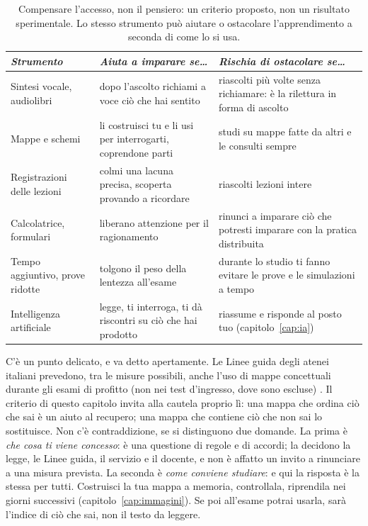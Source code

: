 \begin{table}[tbp]
  \centering\small
  \begin{tabular}{@{}>{\raggedright\arraybackslash}p{}>{\raggedright\arraybackslash}p{}>{\raggedright\arraybackslash}p{}@{}}
    \toprule
    \textit{Strumento} & \textit{Aiuta a imparare se\dots} & \textit{Rischia di ostacolare se\dots} \\
    \midrule
    Sintesi vocale, audiolibri & dopo l'ascolto richiami a voce ciò
      che hai sentito & riascolti più volte senza richiamare: è la
      rilettura in forma di ascolto \\
    \addlinespace
    Mappe e schemi & li costruisci tu e li usi per interrogarti,
      coprendone parti & studi su mappe fatte da altri e le consulti
      sempre \\
    \addlinespace
    Registrazioni delle lezioni & colmi una lacuna precisa, scoperta
      provando a ricordare & riascolti lezioni intere \\
    \addlinespace
    Calcolatrice, formulari & liberano attenzione per il
      ragionamento & rinunci a imparare ciò che potresti imparare con
      la pratica distribuita \\
    \addlinespace
    Tempo aggiuntivo, prove ridotte & tolgono il peso della lentezza
      all'esame & durante lo studio ti fanno evitare le prove e le simulazioni a tempo \\
    \addlinespace
    Intelligenza artificiale & legge, ti interroga, ti dà riscontri
      su ciò che hai prodotto & riassume e risponde al posto tuo
      (capitolo~\ref{cap:ia}) \\
    \bottomrule
  \end{tabular}
  \caption{Compensare l'accesso, non il pensiero: un criterio
    proposto, non un risultato sperimentale. Lo stesso strumento può
    aiutare o ostacolare l'apprendimento a seconda di come lo si usa.}
  \label{tab:compensare}
\end{table}

C'è un punto delicato, e va detto apertamente. Le Linee guida degli
atenei italiani prevedono, tra le misure possibili, anche l'uso di
mappe concettuali durante gli esami di profitto (non nei test
d'ingresso, dove sono escluse) \parencite{cnudd2024}. Il criterio
di questo capitolo invita alla cautela proprio lì: una mappa che
ordina ciò che sai è un aiuto al recupero; una mappa che contiene ciò
che non sai lo sostituisce. Non c'è contraddizione, se si distinguono
due domande. La prima è \emph{che cosa ti viene concesso}: è una questione di regole e di accordi; la decidono la legge, le Linee guida, il servizio e il
docente, e non è affatto un invito a rinunciare a una misura prevista.
La seconda è \emph{come conviene studiare}: e qui la risposta è la
stessa per tutti. Costruisci la tua mappa a memoria, controllala,
riprendila nei giorni successivi (capitolo~\ref{cap:immagini}). Se poi
all'esame potrai usarla, sarà l'indice di ciò che sai, non il testo da
leggere.

